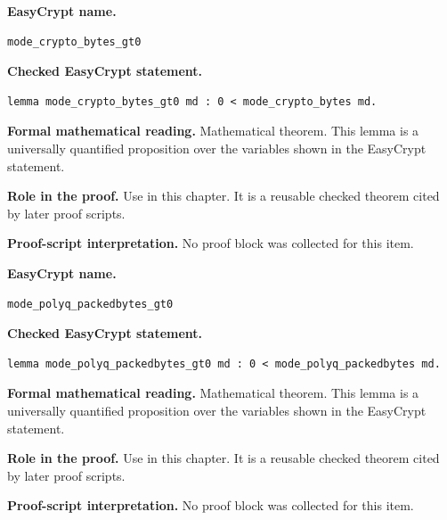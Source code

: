 \begin{formaltheorem}
\noindent\textbf{EasyCrypt name.}
\begin{lstlisting}[language=EasyCrypt,basicstyle=\ttfamily\scriptsize]
mode_crypto_bytes_gt0
\end{lstlisting}
\noindent\textbf{Checked EasyCrypt statement.}
\begin{lstlisting}[language=EasyCrypt,basicstyle=\ttfamily\scriptsize]
lemma mode_crypto_bytes_gt0 md : 0 < mode_crypto_bytes md.
\end{lstlisting}
\noindent\textbf{Formal mathematical reading.}
Mathematical theorem. This lemma is a universally quantified proposition over the variables shown in the EasyCrypt statement.

\noindent\textbf{Role in the proof.}
Use in this chapter. It is a reusable checked theorem cited by later proof scripts.

\noindent\textbf{Proof-script interpretation.}
No proof block was collected for this item.

\end{formaltheorem}

\begin{formaltheorem}
\noindent\textbf{EasyCrypt name.}
\begin{lstlisting}[language=EasyCrypt,basicstyle=\ttfamily\scriptsize]
mode_polyq_packedbytes_gt0
\end{lstlisting}
\noindent\textbf{Checked EasyCrypt statement.}
\begin{lstlisting}[language=EasyCrypt,basicstyle=\ttfamily\scriptsize]
lemma mode_polyq_packedbytes_gt0 md : 0 < mode_polyq_packedbytes md.
\end{lstlisting}
\noindent\textbf{Formal mathematical reading.}
Mathematical theorem. This lemma is a universally quantified proposition over the variables shown in the EasyCrypt statement.

\noindent\textbf{Role in the proof.}
Use in this chapter. It is a reusable checked theorem cited by later proof scripts.

\noindent\textbf{Proof-script interpretation.}
No proof block was collected for this item.

\end{formaltheorem}

